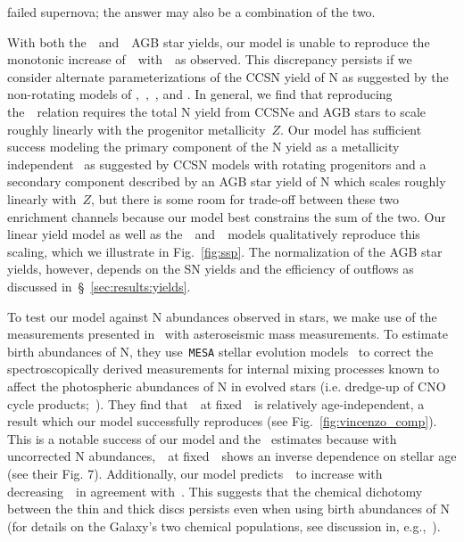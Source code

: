 \documentclass[ms.tex]{subfiles}
\begin{document}
failed supernova; the answer may also be a combination of the two.
\par
With both the~\karakasten~and~\karakas~AGB star yields, our model is
unable to reproduce the monotonic increase of~\no~with~\oh~as observed.
This discrepancy persists if we consider alternate parameterizations of the
CCSN yield of N as suggested by the non-rotating models of
\citet{Woosley1995},~\citet{Nomoto2013},~\citet{Sukhbold2016}, and
\citet{Limongi2018}.
In general, we find that reproducing the~\ohno~relation requires the total N
yield from CCSNe and AGB stars to scale roughly linearly with the progenitor
metallicity~$Z$.
Our model has sufficient success modeling the primary component of the N yield
as a metallicity independent~ as suggested by CCSN models with rotating
progenitors and a secondary component described by an AGB star yield of N which
scales roughly linearly with~$Z$, but there is some room for trade-off
between these two enrichment channels because our model best constrains the sum
of the two.
Our linear yield model as well as the~\cristallo~and~\ventura~models
qualitatively reproduce this scaling, which we illustrate in Fig.~\ref{fig:ssp}.
The normalization of the AGB star yields, however, depends on the SN yields and
the efficiency of outflows as discussed in~\S~\ref{sec:results:yields}.
\par
To test our model against N abundances observed in stars, we make use of the
measurements presented in~\citet{Vincenzo2021} with asteroseismic mass
measurements.
To estimate birth abundances of N, they use~\texttt{MESA} stellar evolution
models~\citep{Paxton2011, Paxton2013, Paxton2015, Paxton2018} to correct the
spectroscopically derived measurements for internal mixing processes known to
affect the photospheric abundances of N in evolved stars (i.e. dredge-up of
CNO cycle products;~\citealp{Gilroy1989, Korn2007, Lind2008, Souto2018,
Souto2019}).
They find that~\no~at fixed~\feh~is relatively age-independent, a result
which our model successfully reproduces (see Fig.~\ref{fig:vincenzo_comp}).
This is a notable success of our model and the~\citet{Vincenzo2021} estimates
because with uncorrected N abundances,~\no~at fixed~\feh~shows an inverse
dependence on stellar age (see their Fig. 7).
Additionally, our model predicts~\no~to increase with decreasing~\ofe~in
agreement with~\citet{Vincenzo2021}.
This suggests that the chemical dichotomy between the thin and thick discs
persists even when using birth abundances of N (for details on the Galaxy's two
chemical populations, see discussion in, e.g.,~\citealp{Hayden2015,
Weinberg2019, Weinberg2021, Griffith2021b}).
\end{document}
